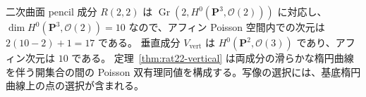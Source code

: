 \begin{remark}
二次曲面 pencil 成分 $R(2,2)$ は
$\operatorname{Gr}(2,H^0(\mathbf P^3,\mathcal O(2)))$ に対応し、
$\dim H^0(\mathbf P^3,\mathcal O(2))=10$ なので、アフィン Poisson 空間内での次元は
$2(10-2)+1=17$ である。
垂直成分 $V_{\mathrm{vert}}$ は
$H^0(\mathbf P^2,\mathcal O(3))$ であり、アフィン次元は $10$ である。
定理~\ref{thm:rat22-vertical} は両成分の滑らかな楕円曲線を伴う開集合の間の
Poisson 双有理同値を構成する。写像の選択には、基底楕円曲線上の点の選択が含まれる。
\end{remark}
